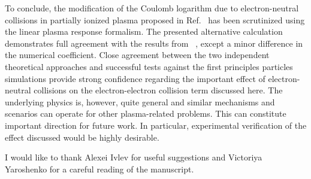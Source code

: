 \documentclass[twocolumn, 
  aps, prl,
  amsmath,amssymb,
  ]{revtex4-1}
\begin{document}
To conclude, the modification of the Coulomb logarithm due to electron-neutral collisions in partially ionized plasma proposed in Ref.~\cite{HagelaarPRL2019} has been scrutinized using the linear plasma response formalism. The presented alternative calculation demonstrates full agreement with the results from ~\citep{HagelaarPRL2019}, except a minor difference in the numerical coefficient. Close agreement between the two independent theoretical approaches and successful tests against the first principles particles simulations provide strong confidence regarding the important effect of electron-neutral collisions on the electron-electron collision term discussed here. The underlying physics is, however, quite general and similar mechanisms and scenarios can operate for other plasma-related problems. This can constitute important direction for future work. In particular, experimental verification of the effect discussed would be highly desirable.   
  
I would like to thank Alexei Ivlev for useful suggestions and Victoriya Yaroshenko for a careful reading of the manuscript.





\end{document}
